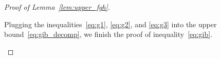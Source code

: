 \documentclass[lettersize,onecolumn,journal]{IEEEtran}
\theoremstyle{definition}
\theoremstyle{definition}
\newcommand{\of}[1]{\left(#1\right)}
\begin{document}
\begin{proof}[Proof of Lemma~\ref{lem:upper_fgh}]
\begin{enumerate}
    Plugging the inequalities~\eqref{eq:g1}, \eqref{eq:g2}, and \eqref{eq:g3} into the upper bound~\eqref{eq:gib_decomp}, we finish the proof of inequality~\eqref{eq:gib}.
    
    
    

\end{enumerate}
\end{proof}
\end{document}
